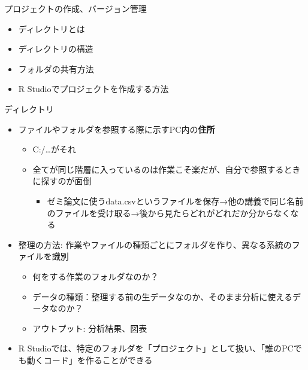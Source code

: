 \documentclass[
  ignorenonframetext,
]{beamer}
\providecommand{\tightlist}{%
  \setlength{\itemsep}{0pt}\setlength{\parskip}{0pt}}
\begin{document}
\begin{frame}[fragile]{プロジェクトの作成、バージョン管理}
\protect\hypertarget{ux30d7ux30edux30b8ux30a7ux30afux30c8ux306eux4f5cux6210ux30d0ux30fcux30b8ux30e7ux30f3ux7ba1ux7406}{}
\begin{itemize}
\tightlist
\item
  ディレクトリとは
\item
  ディレクトリの構造
\item
  フォルダの共有方法
\item
  R Studioでプロジェクトを作成する方法
\end{itemize}

\begin{block}{ディレクトリ}
\protect\hypertarget{ux30c7ux30a3ux30ecux30afux30c8ux30ea}{}
\begin{itemize}
\tightlist
\item
  ファイルやフォルダを参照する際に示すPC内の\textbf{住所}

  \begin{itemize}
  \tightlist
  \item
    C:/\ldots がそれ
  \item
    全てが同じ階層に入っているのは作業こそ楽だが、自分で参照するときに探すのが面倒

    \begin{itemize}
    \tightlist
    \item
      ゼミ論文に使うdata.csvというファイルを保存→他の講義で同じ名前のファイルを受け取る→後から見たらどれがどれだか分からなくなる
    \end{itemize}
  \end{itemize}
\item
  整理の方法:
  作業やファイルの種類ごとにフォルダを作り、異なる系統のファイルを識別

  \begin{itemize}
  \tightlist
  \item
    何をする作業のフォルダなのか？
  \item
    データの種類：整理する前の生データなのか、そのまま分析に使えるデータなのか？
  \item
    アウトプット: 分析結果、図表
  \end{itemize}
\item
  R
  Studioでは、特定のフォルダを「プロジェクト」として扱い、「誰のPCでも動くコード」を作ることができる
\end{itemize}
\end{block}


\end{frame}
\end{document}
